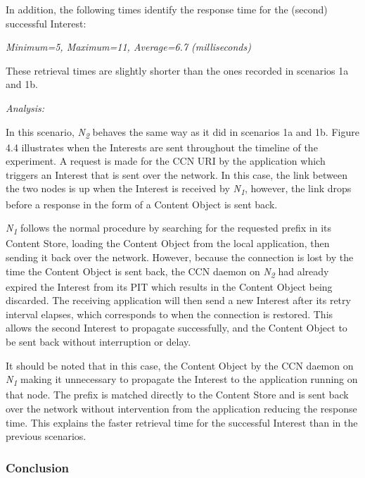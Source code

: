 \documentclass[a4paper,12pt]{report}      %
\begin{document}
In addition, the following times identify the response time for the (second) successful Interest:

\begin{center}\textsl{Minimum=5, Maximum=11, Average=6.7 (milliseconds)}\end{center}

These retrieval times are slightly shorter than the ones recorded in scenarios 1a and 1b.

\vspace*{1\baselineskip}\noindent\emph{Analysis:}

In this scenario, \emph{N\textsubscript{2}} behaves the same way as it did in scenarios 1a and 1b. Figure 4.4 illustrates when the Interests
are sent throughout the timeline of the experiment. A request is made for the CCN URI by the application which triggers an Interest that is sent over the network. In this case, the link between the two nodes is up when the Interest is received by \emph{N\textsubscript{1}}, 
however, the link drops before a response in the form of a Content Object is sent back.

\emph{N\textsubscript{1}} follows the normal procedure by searching for the requested prefix in its Content
Store, loading the Content Object from the local application, then sending it back over the network.
However, because the connection is lost by the time the Content Object is sent back, the CCN
daemon on \emph{N\textsubscript{2}} had already expired the Interest from its PIT which results in the Content
Object being discarded. The receiving application will then send a new Interest after its retry
interval elapses, which corresponds to when the connection is restored. This allows the second Interest
to propagate successfully, and the Content Object to be sent back without interruption or delay.

It should be noted that in this case, the Content Object by the CCN daemon on \emph{N\textsubscript{1}}  making
it unnecessary to propagate the Interest to the application running on that node. The prefix is matched
directly to the Content Store and is sent back over the network without intervention from the
application reducing the response time. This explains the faster retrieval time for the successful
Interest than in the previous scenarios.

\subsubsection{Conclusion}
\end{document}
